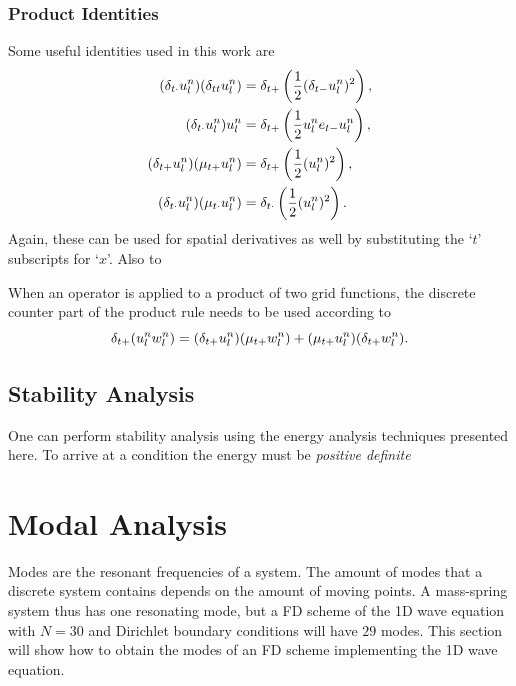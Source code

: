 \subsubsection{Product Identities}
Some useful identities used in this work are
\begin{subequations}
    \begin{align}
        (\delta_{t\cdot} u_l^n)(\delta_{tt} u_l^n) &= \delta_{t+} \left(\frac{1}{2}(\delta_{t-} u_l^n)^2\right),\label{eq:prodIdentity1}\\
        (\delta_{t\cdot} u_l^n)u_l^n &= \delta_{t+} \left(\frac{1}{2}u_l^n e_{t-}u_l^n\right),\label{eq:prodIdentity2}\\
        (\delta_{t+} u_l^n)(\mu_{t+} u_l^n) &= \delta_{t+} \left(\frac{1}{2}(u_l^n)^2\right),\label{eq:prodIdentity3}\\
        (\delta_{t\cdot} u_l^n)(\mu_{t\cdot}u_l^n) &= \delta_{t\cdot}\left(\frac{1}{2} (u_l^n)^2\right).\label{eq:prodIdentity4}
    \end{align}
\end{subequations}
Again, these can be used for spatial derivatives as well by substituting the `$t$' subscripts for `$x$'. Also  to 

When an operator is applied to a product of two grid functions, the discrete counter part of the product rule needs to be used according to
\begin{equation}
    \delta_{t+} (u_l^nw_l^n) = (\delta_{t+} u_l^n)(\mu_{t+}w_l^n) + (\mu_{t+} u_l^n)(\delta_{t+} w_l^n).
\end{equation}


\subsection{Stability Analysis}
One can perform stability analysis using the energy analysis techniques presented here. To arrive at a condition the energy must be \textit{positive definite} 

\section{Modal Analysis}
\label{sec:modalAnalysis}
Modes are the resonant frequencies of a system. The amount of modes that a discrete system contains depends on the amount of moving points. A mass-spring system thus has one resonating mode, but a FD scheme of the 1D wave equation with $N = 30$ and Dirichlet boundary conditions will have $29$ modes. This section will show how to obtain the modes of an FD scheme implementing the 1D wave equation. 

